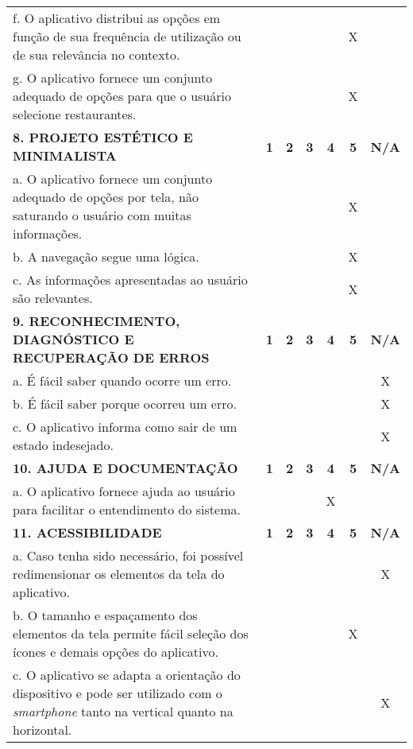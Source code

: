 \documentclass[portuguese,oneside]{tcc}
\begin{document}
\begin{table}[h]
{\begin{tabu}{|L{25em}|c|c|c|c|c|c|}
							f. O aplicativo distribui as opções em função de sua frequência de utilização ou de sua relevância no contexto.	& & & & & X & \\ 
							g. O aplicativo fornece um conjunto adequado de opções para que o usuário selecione restaurantes. & & & & & X & \\ 
							\textbf{8. PROJETO ESTÉTICO E MINIMALISTA} & \textbf{1} & \textbf{2} & \textbf{3} & \textbf{4} & \textbf{5} & \textbf{N/A} \\ 
							a. O aplicativo fornece um conjunto adequado de opções por tela, não saturando o usuário com muitas informações. & & & & & X & \\ 
							b. A navegação segue uma lógica. & & & & & X & \\ 
							c. As informações apresentadas ao usuário são relevantes. & & & & & X & \\ 
							\textbf{9. RECONHECIMENTO, DIAGNÓSTICO E RECUPERAÇÃO DE ERROS} & \textbf{1} & \textbf{2} & \textbf{3} & \textbf{4} & \textbf{5} & \textbf{N/A} \\ 
							a. É fácil saber quando ocorre um erro.	& & & & & & X \\ 
							b. É fácil saber porque ocorreu um erro. & & & & & & X \\ 
							c. O aplicativo informa como sair de um estado indesejado. & & & & & & X \\ 
							\textbf{10. AJUDA E DOCUMENTAÇÃO} & \textbf{1} & \textbf{2} & \textbf{3} & \textbf{4} & \textbf{5} & \textbf{N/A} \\ 
							a. O aplicativo fornece ajuda ao usuário para facilitar o entendimento do sistema. & & & & X & & \\ 
							\textbf{11. ACESSIBILIDADE} & \textbf{1} & \textbf{2} & \textbf{3} & \textbf{4} & \textbf{5} & \textbf{N/A} \\ 
							a. Caso tenha sido necessário, foi possível redimensionar os elementos da tela do aplicativo. & & & & & & X \\ 
							b. O tamanho e espaçamento dos elementos da tela permite fácil seleção dos ícones e demais opções do aplicativo. & & & & & X & \\ 
							c. O aplicativo se adapta a orientação do dispositivo e pode ser utilizado com o \emph{smartphone} tanto na vertical quanto na horizontal. & & & & & & X \\ 

\end{tabu}}
\end{table}
\end{document}
